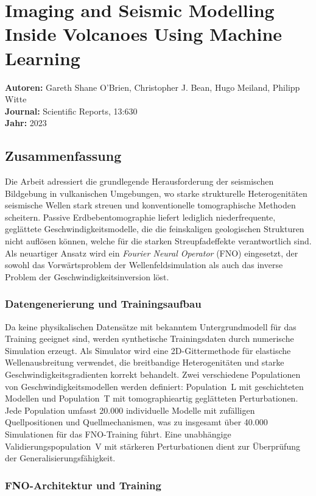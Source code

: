 \documentclass[a4paper,12pt]{article}
\begin{document}
\section*{Imaging and Seismic Modelling Inside Volcanoes Using Machine Learning}
\textbf{Autoren:} Gareth Shane O'Brien, Christopher J. Bean, Hugo Meiland, Philipp Witte \\
\textbf{Journal:} Scientific Reports, 13:630 \\
\textbf{Jahr:} 2023

\subsection*{Zusammenfassung}

Die Arbeit adressiert die grundlegende Herausforderung der seismischen Bildgebung in vulkanischen 
Umgebungen, wo starke strukturelle Heterogenitäten seismische Wellen stark streuen und konventionelle 
tomographische Methoden scheitern. Passive Erdbebentomographie liefert lediglich niederfrequente, 
geglättete Geschwindigkeitsmodelle, die die feinskaligen geologischen Strukturen nicht auflösen können, 
welche für die starken Streupfadeffekte verantwortlich sind. Als neuartiger Ansatz wird ein 
\textit{Fourier Neural Operator} (FNO) eingesetzt, der sowohl das Vorwärtsproblem der 
Wellenfeldsimulation als auch das inverse Problem der Geschwindigkeitsinversion löst.

\subsubsection*{Datengenerierung und Trainingsaufbau}

Da keine physikalischen Datensätze mit bekanntem Untergrundmodell für das Training geeignet sind, 
werden synthetische Trainingsdaten durch numerische Simulation erzeugt. Als Simulator wird eine 
2D-Gittermethode für elastische Wellenausbreitung verwendet, die breitbandige Heterogenitäten und 
starke Geschwindigkeitsgradienten korrekt behandelt. Zwei verschiedene Populationen von 
Geschwindigkeitsmodellen werden definiert: Population~L mit geschichteten Modellen und 
Population~T mit tomographieartig geglätteten Perturbationen. Jede Population umfasst 20.000 
individuelle Modelle mit zufälligen Quellpositionen und Quellmechanismen, was zu insgesamt 
über 40.000 Simulationen für das FNO-Training führt. Eine unabhängige Validierungspopulation~V 
mit stärkeren Perturbationen dient zur Überprüfung der Generalisierungsfähigkeit.

\subsubsection*{FNO-Architektur und Training}
\end{document}
